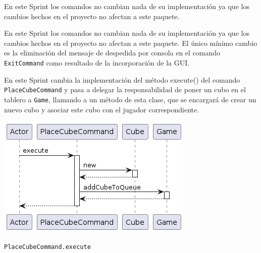 \documentclass[../DocumentoOficial.tex]{subfiles}
\begin{document}
\begin{sprint}[4]
En este Sprint los comandos no cambian nada de su implementación ya que los cambios hechos en el proyecto no afectan a este paquete.
\end{sprint}

\begin{sprint}[5]
En este Sprint los comandos no cambian nada de su implementación ya que los cambios hechos en el proyecto no afectan a este paquete. El único mínimo cambio es la eliminación del mensaje de despedida por consola en el comando \texttt{ExitCommand} como resultado de la incorporación de la GUI.
\end{sprint}

\begin{sprint}[6]
En este Sprint cambia la implementación del método execute() del comando \texttt{PlaceCubeCommand} y pasa a delegar la responsabilidad de poner un cubo en el tablero a \texttt{Game}, llamando a un método de esta clase, que se encargará de crear un nuevo cubo y asociar este cubo con el jugador correspondiente.

\begin{center}
\includegraphics[scale=0.5]{PlaceCubeCommand_execute_sprint6.png}

\texttt{PlaceCubeCommand.execute}
\end{center}
\end{sprint}

\end{document}
